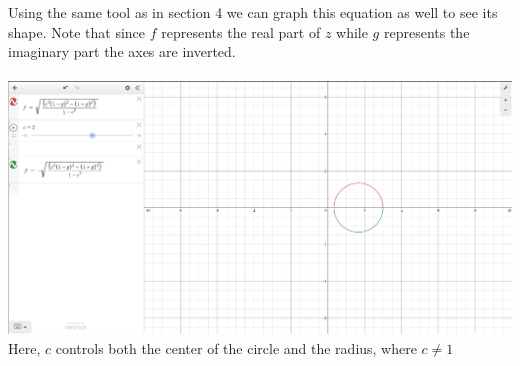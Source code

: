\documentclass[10pt]{article}
\begin{document}
Using the same tool as in section 4 we can graph this equation as well to see its shape. Note that since $f$ represents the real part of $z$ while $g$ represents the imaginary part the axes are inverted.\\\\
\includegraphics[width=\textwidth]{Figure3}\\
Here, $c$ controls both the center of the circle and the radius, where $c\neq1$
\end{document}

